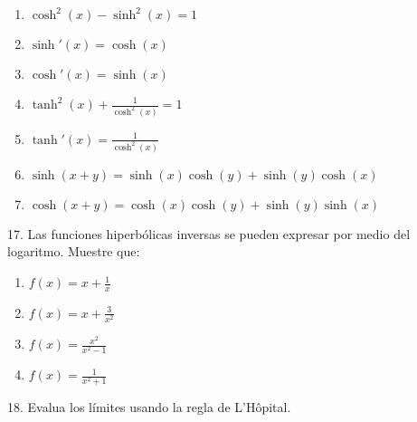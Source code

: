\documentclass[12pt]{article}
\begin{document}
\begin{enumerate}[\hspace{9px} a)]
    \item \(\cosh^2(x)-\sinh^2(x)=1\)

    \item \(\sinh'(x)=\cosh(x)\)

    \item \(\cosh'(x)=\sinh(x)\)

    \item \(\tanh^2(x)+\displaystyle\frac{1}{\cosh^2(x)}=1\)

    \item \(\tanh'(x)=\displaystyle\frac{1}{\cosh^2(x)}\)

    \item \(\sinh(x+y)=\sinh(x)\cosh(y)+\sinh(y)\cosh(x)\)

    \item \(\cosh(x+y)=\cosh(x)\cosh(y)+\sinh(y)\sinh(x)\)

\end{enumerate}

17. Las funciones hiperb\'olicas inversas se pueden expresar por medio del logaritmo. Muestre que:

\begin{enumerate}[\hspace{9px} a)]
    \item \(f(x)=x+\displaystyle\frac{1}{x}\)

    \item \(f(x)=x+\displaystyle\frac{3}{x^2}\)

    \item \(f(x)=\displaystyle\frac{x^2}{x^2-1}\)

    \item \(f(x)=\displaystyle\frac{1}{x^2+1}\)

\end{enumerate}

18. Evalua los l\'imites usando la regla de L'H\^opital.
\end{document}
